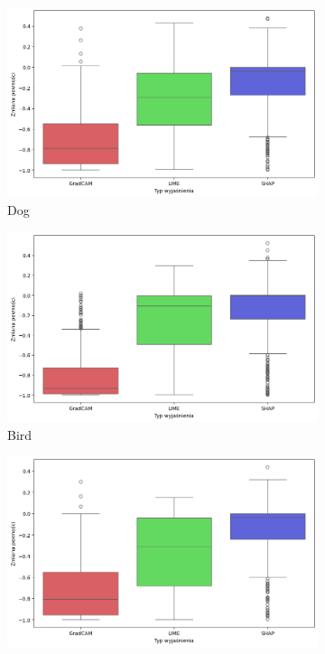\begin{figure}[h]
	\centering
	\begin{subfigure}[b]{0.3\textwidth}
		\includegraphics[width=.9\textwidth]{img/base_confidence_no_exp_dog}
		\caption{Dog}  \label{rys:base_confidence_no_exp_dog}
	\end{subfigure}
	\begin{subfigure}[b]{0.3\textwidth}
		\centering\includegraphics[width=.9\textwidth]{img/base_confidence_no_exp_bird}
		\caption{Bird}  \label{rys:base_confidence_no_exp_bird}
	\end{subfigure}
	\begin{subfigure}[b]{0.3\textwidth}
		\centering\includegraphics[width=.9\textwidth]{img/base_confidence_no_exp_vehicle}

\end{subfigure}
\end{figure}

